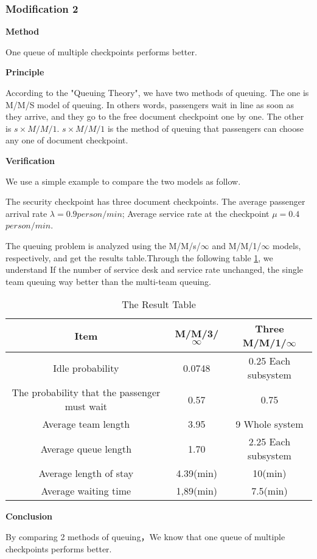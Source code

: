 \documentclass{mcmthesis}
\begin{document}
\subsubsection*{Modification 2}
\par \textbf{Method}
\par One queue of multiple checkpoints performs better.
\par \textbf{Principle}
\par According to the "Queuing Theory", we have two methods of queuing. The one is M/M/S model of queuing. In others words, passengers wait in line as soon as they arrive, and they go to the free document checkpoint one by one. The other is $s \times M/M/1$. $s \times M/M/1$ is the method of queuing that passengers can choose any one of document checkpoint.
\par \textbf{Verification}
\par We use a simple example to compare the two models as follow.
\par The security checkpoint has three document checkpoints. The average passenger arrival rate $\lambda = 0.9person/min$; Average service rate at the checkpoint $\mu = 0.4 $$ person/min$.
\par The queuing problem is analyzed using the M/M/s/$\infty$ and M/M/1/$\infty$ models, respectively, and get the results table.Through the following table \ref{compareTable}, we understand If the number of service desk and service rate unchanged, the single team queuing way better than the multi-team queuing.
\begin{table}[!htb]
\centering
\caption{The Result Table}
\label{compareTable}
\begin{tabular}{@{}c|c|c@{}}
\toprule
Item                                         & M/M/3/$\infty$                    & Three M/M/1/$\infty$                        \\ \midrule
Idle probability                             & \cellcolor[HTML]{9AFF99}0.0748    & \cellcolor[HTML]{FFFC9E}0.25 Each subsystem \\
The probability that the passenger must wait & \cellcolor[HTML]{9AFF99}0.57      & \cellcolor[HTML]{FFFC9E}0.75                \\
Average team length                          & \cellcolor[HTML]{9AFF99}3.95      & \cellcolor[HTML]{FFFC9E}9 Whole system      \\
Average queue length                         & \cellcolor[HTML]{9AFF99}1.70      & \cellcolor[HTML]{FFFC9E}2.25 Each subsystem \\
Average length of stay                       & \cellcolor[HTML]{9AFF99}4.39(min) & \cellcolor[HTML]{FFFC9E}10(min)             \\
Average waiting time                         & \cellcolor[HTML]{9AFF99}1,89(min) & \cellcolor[HTML]{FFFC9E}7.5(min)  \\
\bottomrule        
\end{tabular}
\end{table}
\par \textbf{Conclusion}
\par By comparing 2 methods of queuing，We know that one queue of multiple checkpoints performs better.
\end{document}

